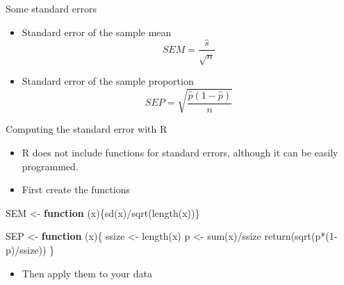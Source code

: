 \documentclass[
  ignorenonframetext,
]{beamer}
\newenvironment{Shaded}{\begin{snugshade}}{\end{snugshade}}
\newcommand{\ControlFlowTok}[1]{\textcolor[rgb]{0.13,0.29,0.53}{\textbf{#1}}}
\newcommand{\DecValTok}[1]{\textcolor[rgb]{0.00,0.00,0.81}{#1}}
\newcommand{\FunctionTok}[1]{\textcolor[rgb]{0.00,0.00,0.00}{#1}}
\newcommand{\NormalTok}[1]{#1}
\newcommand{\OtherTok}[1]{\textcolor[rgb]{0.56,0.35,0.01}{#1}}
\newcommand{\SpecialCharTok}[1]{\textcolor[rgb]{0.00,0.00,0.00}{#1}}
\newcommand{\StringTok}[1]{\textcolor[rgb]{0.31,0.60,0.02}{#1}}
\providecommand{\tightlist}{%
  \setlength{\itemsep}{0pt}\setlength{\parskip}{0pt}}
\begin{document}
\begin{frame}{Some standard errors}
\protect\hypertarget{some-standard-errors}{}
\begin{itemize}
\tightlist
\item
  Standard error of the sample mean \[
  SEM = \frac{\hat s}{\sqrt{n}}
  \]
\item
  Standard error of the sample proportion \[
  SEP = \sqrt{\frac{\hat p (1-\hat p)}{n}}
  \]
\end{itemize}
\end{frame}

\begin{frame}[fragile]{Computing the standard error with R}
\protect\hypertarget{computing-the-standard-error-with-r}{}
\begin{itemize}
\item
  R does not include functions for standard errors, although it can be
  easily programmed.
\item
  First create the functions
\end{itemize}

\small

\begin{Shaded}
\begin{Highlighting}[]
\NormalTok{SEM }\OtherTok{\textless{}{-}} \ControlFlowTok{function}\NormalTok{ (x)\{}\FunctionTok{sd}\NormalTok{(x)}\SpecialCharTok{/}\FunctionTok{sqrt}\NormalTok{(}\FunctionTok{length}\NormalTok{(x))\}}

\NormalTok{SEP }\OtherTok{\textless{}{-}} \ControlFlowTok{function}\NormalTok{ (x)\{}
\NormalTok{  ssize }\OtherTok{\textless{}{-}} \FunctionTok{length}\NormalTok{(x)}
\NormalTok{  p }\OtherTok{\textless{}{-}} \FunctionTok{sum}\NormalTok{(x)}\SpecialCharTok{/}\NormalTok{ssize}
  \FunctionTok{return}\NormalTok{(}\FunctionTok{sqrt}\NormalTok{(p}\SpecialCharTok{*}\NormalTok{(}\DecValTok{1}\SpecialCharTok{{-}}\NormalTok{p)}\SpecialCharTok{/}\NormalTok{ssize))}
\NormalTok{\}}
\end{Highlighting}
\end{Shaded}

\begin{itemize}
\tightlist
\item
  Then apply them to your data
\end{itemize}

\begin{Shaded}
\end{Shaded}


\end{frame}
\end{document}
